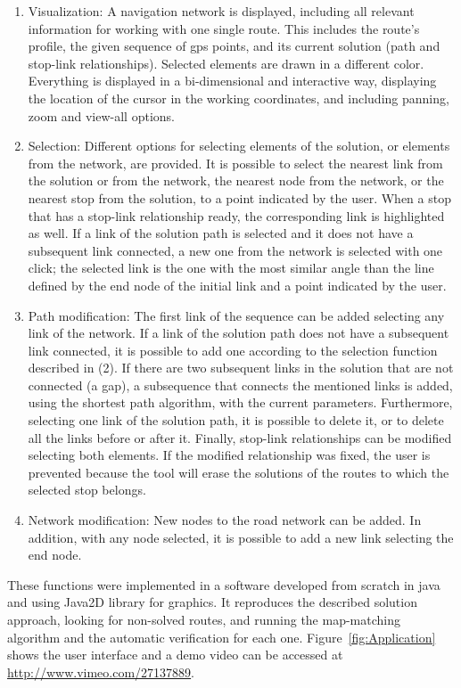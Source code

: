 \begin{enumerate}
\item Visualization: A navigation network is displayed, including all relevant information for working with one single route. This includes the route's profile, the given sequence of \gls{gps} points, and its current solution (path and stop-link relationships). Selected elements are drawn in a different color. Everything is displayed in a bi-dimensional and interactive way, displaying the location of the cursor in the working coordinates, and including panning, zoom and view-all options.
%
\item Selection: Different options for selecting elements of the solution, or elements from the network, are provided. It is possible to select the nearest link from the solution or from the network, the nearest node from the network, or the nearest stop from the solution, to a point indicated by the user. When a stop that has a stop-link relationship ready, the corresponding link is highlighted as well. If a link of the solution path is selected and it does not have a subsequent link connected, a new one from the network is selected with one click; the selected link is the one with the most similar angle than the line defined by the end node of the initial link and a point indicated by the user.
%
\item Path modification: The first link of the sequence can be added selecting any link of the network. If a link of the solution path does not have a subsequent link connected, it is possible to add one according to the selection function described in (2). If there are two subsequent links in the solution that are not connected (a gap), a subsequence that connects the mentioned links is added, using the shortest path algorithm, with the current parameters. Furthermore, selecting one link of the solution path, it is possible to delete it, or to delete all the links before or after it. Finally, stop-link relationships can be modified selecting both elements. If the modified relationship was fixed, the user  is prevented because the tool will erase the solutions of the routes to which the selected stop belongs.
%
\item Network modification: New nodes to the road network can be added. In addition, with any node selected, it is possible to add a new link selecting the end node.
\end{enumerate}

These functions were implemented in a software developed from scratch in \gls{java} and using Java2D library for graphics. It reproduces the described solution approach, looking for non-solved routes, and running the map-matching algorithm and the automatic verification for each one. Figure~\ref{fig:Application} shows the user interface and a demo video can be accessed at \url{http://www.vimeo.com/27137889}.

